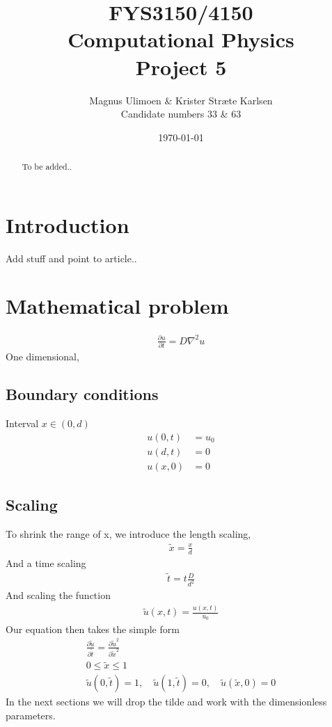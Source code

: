 \documentclass[11pt,a4paper,draft]{article}
\title{FYS3150/4150\\Computational Physics\\Project 5}
\author{Magnus Ulimoen \& Krister Stræte Karlsen\\
Candidate numbers 33 \& 63}
\date{\today}
\numberwithin{equation}{section}
\begin{document}
\maketitle

\begin{abstract}
To be added..
\end{abstract}

\section{Introduction}
Add stuff and point to article..


\section{Mathematical problem}

\begin{gather}
\frac{\partial u}{\partial t} = D\nabla^2u
\end{gather}
One dimensional,
\subsection{Boundary conditions}
Interval $x \in (0, d)$
\begin{align}
u(0,t) &= u_0\\
u(d,t) &= 0\\
u(x,0) &= 0
\end{align}

\subsection{Scaling}

To shrink the range of x, we introduce the length scaling,
\begin{gather}
\tilde{x} = \frac{x}{d}
\end{gather}
And a time scaling
\begin{gather}
\tilde{t} = t\frac{D}{d^2}
\end{gather}
And scaling the function
\begin{gather}
\tilde{u}(x,t) = \frac{u(x,t)}{u_0}
\end{gather}
Our equation then takes the simple form
\begin{gather}
\frac{\partial \tilde{u}}{\partial \tilde{t}}
= \frac{\partial \tilde{u}^2}{\partial \tilde{x}^2}\\
0 \le \tilde{x} \le 1\\
\tilde{u}(0,\tilde{t})
= 1, \quad \tilde{u}(1,\tilde{t}) = 0, \quad \tilde{u}(\tilde{x}, 0 ) = 0
\end{gather}
In the next sections we will drop the tilde and work with the 
dimensionless parameters.
\end{document}
